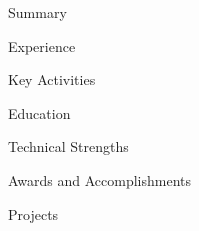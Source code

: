 \documentclass{resume}
\begin{document}

\begin{rSection}{Summary}

\end{rSection}


\begin{rSection}{Experience}

\end{rSection}


\begin{rSection}{Key Activities}

\end{rSection}


\begin{rSection}{Education}

\end{rSection}


\begin{rSection}{Technical Strengths}

\end{rSection}


\begin{rSection}{Awards and Accomplishments}

\end{rSection}


\begin{rSection}{Projects}

\end{rSection}
\end{document}
